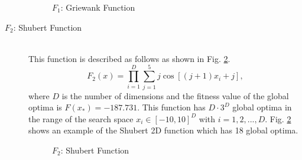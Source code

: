 \begin{description}
\begin{figure}[h]
\caption{$F_1$: Griewank Function}
\label{fig:f1}
\end{figure}

\item[$F_2$: Shubert Function]\mbox{}\\
 This function is described as follows as shown in Fig. \ref{fig:f2}.
 \begin{equation}
F_2(x) = \prod_{i=1}^D \sum_{j=1}^5 j \cos[(j+1)x_i+j], 
\end{equation}
where $D$ is the number of dimensions and the fitness value of the global optima is ${F(x_*)=-187.731}$. This function has  $D \cdot 3^D $ global optima in the range of the search space $x_i \in [-10, 10]^D$ with $i=1,2,...,D$. Fig. \ref{fig:f2} shows an example of the Shubert 2D function which has 18 global optima. 

\begin{figure}[h]
\centering
{}

\caption{$F_2$: Shubert Function}
\label{fig:f2}
\end{figure}

\end{description}
